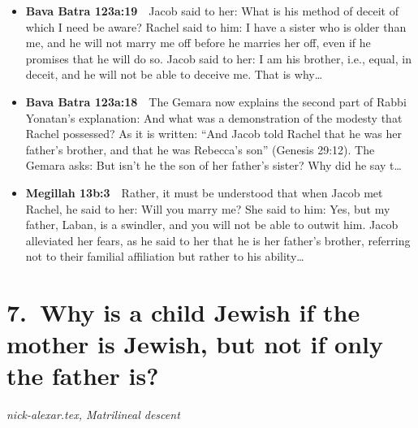 \documentclass[11pt,a4paper]{article}
\begin{document}
\begin{itemize}[leftmargin=1.2em,itemsep=3pt]
\item {\color{ref}\textbf{Bava Batra 123a:19}}\ \ Jacob said to her: What is his method of deceit of which I need be aware? Rachel said to him: I have a sister who is older than me, and he will not marry me off before he marries her off, even if he promises that he will do so. Jacob said to her: I am his brother, i.e., equal, in deceit, and he will not be able to deceive me. That is why\ldots
\item {\color{ref}\textbf{Bava Batra 123a:18}}\ \ The Gemara now explains the second part of Rabbi Yonatan’s explanation: And what was a demonstration of the modesty that Rachel possessed? As it is written: “And Jacob told Rachel that he was her father’s brother, and that he was Rebecca’s son” (Genesis 29:12). The Gemara asks: But isn’t he the son of her father’s sister? Why did he say t\ldots
\item {\color{ref}\textbf{Megillah 13b:3}}\ \ Rather, it must be understood that when Jacob met Rachel, he said to her: Will you marry me? She said to him: Yes, but my father, Laban, is a swindler, and you will not be able to outwit him. Jacob alleviated her fears, as he said to her that he is her father’s brother, referring not to their familial affiliation but rather to his ability\ldots
\end{itemize}

\section*{7.\ Why is a child Jewish if the mother is Jewish, but not if only the father is?}
{\color{quiet}\small\textit{nick-alexar.tex, Matrilineal descent}}
\end{document}
